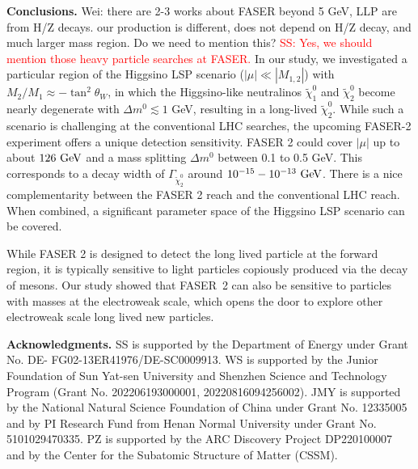 \documentclass[
    prl,
    twocolumn,
    superscriptaddress,
    nofootinbib,
    amsmath, amssymb,
    aps,
    reprint,
    floatfix
]{revtex4-2}
\newcommand{\Wei}[1]{\textcolor{green2} {Wei: #1}}
\newcommand{\Shufang}[1]{\textcolor{red} {SS: #1}}
\begin{document}
\vspace{0.5em}\noindent
\textbf{Conclusions.}
\label{sec:sum}
\Wei{there are 2-3 works about FASER beyond 5 GeV, LLP are from H/Z decays. our production is different, does not depend on H/Z decay, and much larger mass region. Do we need to mention this?} \Shufang{Yes, we should mention those heavy particle searches at FASER.}
In our study, we investigated a particular region of the Higgsino LSP scenario ($|\mu| \ll |M_{1,2}|$) with $M_2/M_1 \approx -\tan^2{\theta_W}$, in which the Higgsino-like neutralinos $\tilde{\chi}_1^0$ and $\tilde{\chi}_2^0$ become nearly degenerate with $\Delta m^0 \lesssim 1$ GeV, resulting in a long-lived $\tilde{\chi}_2^0$. While such a scenario is challenging at the conventional LHC searches, the upcoming FASER-2 experiment offers a unique detection sensitivity. FASER 2 could cover $|\mu|$ up to about $126~{\rm GeV}$ and a mass splitting $\Delta m^0$ between 0.1 to 0.5 GeV. This corresponds to a decay width of $\Gamma_{\tilde{\chi}_2^0}$ around $ 10^{-15} - 10^{-13}~{\rm GeV}$.  There is a nice complementarity between the FASER 2 reach and the conventional LHC reach.  When combined, a significant parameter space  of the Higgsino LSP scenario can be covered.

While FASER 2 is designed to detect the long lived particle at the forward region, it is typically sensitive to light particles copiously produced via the decay of mesons.  Our study  showed that FASER~2 can also be sensitive to  particles with masses at the electroweak scale, which opens the door to explore other electroweak scale long lived new particles.

\vspace{0.5em}\noindent
\textbf{Acknowledgments.}
SS is supported by the Department of Energy under Grant No. DE-
FG02-13ER41976/DE-SC0009913. 
WS is supported by the Junior Foundation of Sun Yat-sen University and Shenzhen Science and Technology Program (Grant No. 202206193000001, 20220816094256002). 
JMY is supported by the National Natural Science Foundation of China under Grant No. 12335005 and by PI Research Fund from Henan Normal University under Grant No. 5101029470335. 
PZ is supported by the ARC Discovery Project DP220100007 and by the Center for the Subatomic Structure of Matter (CSSM).





% 
% 
\end{document}
